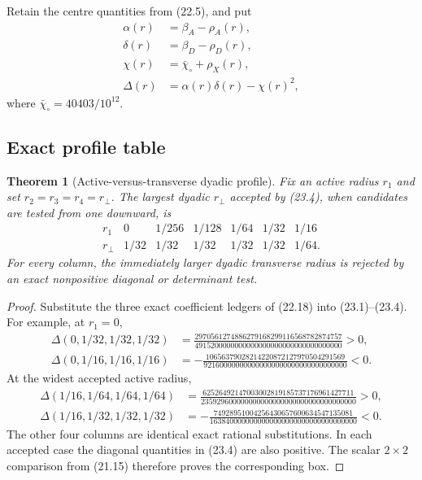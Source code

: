 \documentclass[11pt,oneside]{article}
\newtheorem{theorem}{Theorem}[section]
\theoremstyle{definition}
\theoremstyle{remark}
\begin{document}
Retain the centre quantities from (22.5), and put
\[
\begin{aligned}
\alpha(r)&=\beta_A-\rho_A(r),\\
\delta(r)&=\beta_D-\rho_D(r),\\
\chi(r)&=\bar\chi_\circ+\rho_X(r),\\
\Delta(r)&=\alpha(r)\delta(r)-\chi(r)^2,
\end{aligned}                                            \tag{23.4}
\]
where \(\bar\chi_\circ=40403/10^{12}\).

\subsection{Exact profile table}

\begin{theorem}[Active-versus-transverse dyadic profile]
\label{thm:newv23-profiles}
Fix an active radius \(r_1\) and set
\(r_2=r_3=r_4=r_\perp\).  The largest dyadic
\(r_\perp\) accepted by (23.4), when candidates are tested from one
downward, is
\[
\begin{array}{c|cccccc}
r_1&0&1/256&1/128&1/64&1/32&1/16\\ \hline
r_\perp&1/32&1/32&1/32&1/32&1/32&1/64.
\end{array}                                              \tag{23.5}
\]
For every column, the immediately larger dyadic transverse radius
is rejected by an exact nonpositive diagonal or determinant test.
\end{theorem}

\begin{proof}
Substitute the three exact coefficient ledgers of (22.18) into
(23.1)--(23.4).  For example, at \(r_1=0\),
\[
\begin{aligned}
\Delta(0,1/32,1/32,1/32)
&=\frac{
2970561274886279168299116568782874757}
{4915200000000000000000000000000000000}>0,\\
\Delta(0,1/16,1/16,1/16)
&=-\frac{
10656379028214220872127970504291569}
{921600000000000000000000000000000000}<0.
\end{aligned}                                            \tag{23.6}
\]
At the widest accepted active radius,
\[
\begin{aligned}
\Delta(1/16,1/64,1/64,1/64)
&=\frac{
62526492147003002819185737176961427711}
{235929600000000000000000000000000000000}>0,\\
\Delta(1/16,1/32,1/32,1/32)
&=-\frac{
74928951004256430657600634547135081}
{1638400000000000000000000000000000000}<0.
\end{aligned}                                            \tag{23.7}
\]
The other four columns are identical exact rational substitutions.
In each accepted case the diagonal quantities in (23.4) are also
positive.  The scalar \(2\times2\) comparison from (21.15) therefore
proves the corresponding box.
\end{proof}
\end{document}
